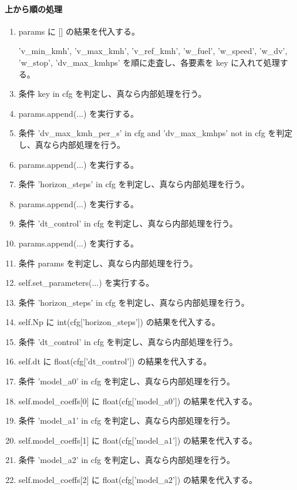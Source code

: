 \documentclass[a4paper,11pt]{article}
\begin{document}
            \paragraph{上から順の処理}
            \begin{enumerate}[leftmargin=1.8em]
            \item params に [] の結果を代入する。
\item ['v\_min\_kmh', 'v\_max\_kmh', 'v\_ref\_kmh', 'w\_fuel', 'w\_speed', 'w\_dv', 'w\_stop', 'dv\_max\_kmhps'] を順に走査し、各要素を key に入れて処理する。
\item   条件 key in cfg を判定し、真なら内部処理を行う。
\item     params.append(...) を実行する。
\item 条件 'dv\_max\_kmh\_per\_s' in cfg and 'dv\_max\_kmhps' not in cfg を判定し、真なら内部処理を行う。
\item   params.append(...) を実行する。
\item 条件 'horizon\_steps' in cfg を判定し、真なら内部処理を行う。
\item   params.append(...) を実行する。
\item 条件 'dt\_control' in cfg を判定し、真なら内部処理を行う。
\item   params.append(...) を実行する。
\item 条件 params を判定し、真なら内部処理を行う。
\item   self.set\_parameters(...) を実行する。
\item 条件 'horizon\_steps' in cfg を判定し、真なら内部処理を行う。
\item   self.Np に int(cfg['horizon\_steps']) の結果を代入する。
\item 条件 'dt\_control' in cfg を判定し、真なら内部処理を行う。
\item   self.dt に float(cfg['dt\_control']) の結果を代入する。
\item 条件 'model\_a0' in cfg を判定し、真なら内部処理を行う。
\item   self.model\_coeffs[0] に float(cfg['model\_a0']) の結果を代入する。
\item 条件 'model\_a1' in cfg を判定し、真なら内部処理を行う。
\item   self.model\_coeffs[1] に float(cfg['model\_a1']) の結果を代入する。
\item 条件 'model\_a2' in cfg を判定し、真なら内部処理を行う。
\item   self.model\_coeffs[2] に float(cfg['model\_a2']) の結果を代入する。

\end{enumerate}
\end{document}
